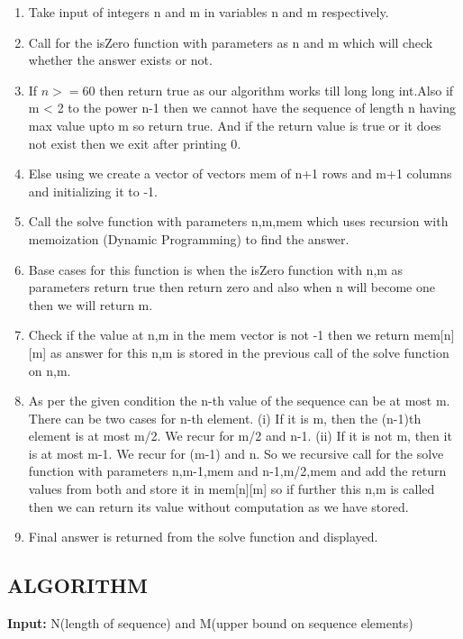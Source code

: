 \documentclass[conference]{IEEEtran}
\begin{document}
\begin{enumerate}
\item Take input of integers n and m in variables n and m respectively. 
\item Call for the isZero function with parameters as n and m which will check whether the answer exists or not. 
\item If $n>=60$ then return true as our algorithm works till long long int.Also if m < 2 to the power n-1 then we cannot have the sequence of length n having max value upto m so return true. And if the return value is true or it does not exist then we exit after printing 0.
\item Else using we create a vector of vectors mem of n+1 rows and m+1 columns and initializing it to -1.
\item Call the solve function with parameters n,m,mem which uses recursion with memoization (Dynamic Programming) to find the answer.
\item Base cases for this function is when the isZero function with n,m as parameters return true then return zero and also when n will become one then we will return m.
\item Check if the value at n,m in the mem vector is not -1 then we return mem[n][m] as answer for this n,m is stored in the previous call of the solve function on n,m.
\item As per the given condition the n-th value of the sequence can be at most m. There can be two cases for n-th element.
\newline
   (i) If it is m, then the (n-1)th element is at most m/2. We recur for m/2 and n-1.
   \newline
   (ii) If it is not m, then it is at most m-1. We recur for (m-1) and n.
   \newline
 So we recursive call for the solve function with parameters  n,m-1,mem and n-1,m/2,mem and add the return values from both and store it in mem[n][m] so if further this n,m is called then we can  return its value without computation as we have stored.
\item Final answer is returned from the solve function and displayed.


\end{enumerate}

\subsection{ALGORITHM }

\textbf{Input:} N(length of sequence) and M(upper bound on sequence elements)
\end{document}
